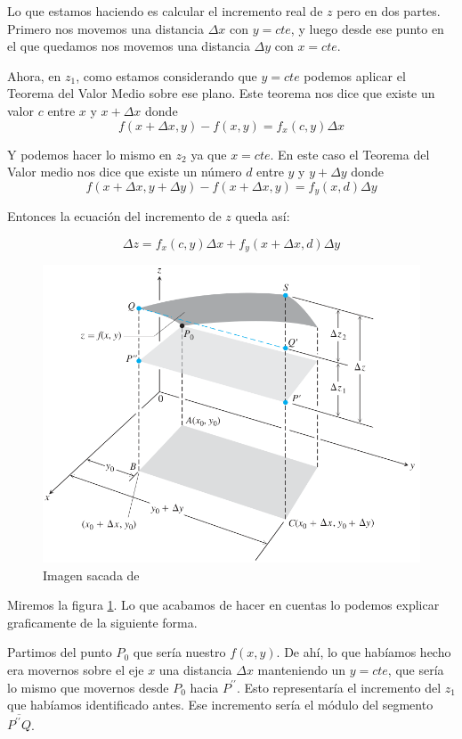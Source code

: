 \documentclass[12pt]{article}
\begin{document}
Lo que estamos haciendo es calcular el incremento real de $ z $ pero en dos partes. Primero nos movemos una distancia $ \Delta x $ con $ y = cte $, y luego desde ese punto en el que quedamos nos movemos una distancia $ \Delta y $ con $ x = cte $.

Ahora, en $ z_{1} $, como estamos considerando que $ y=cte $ podemos aplicar el Teorema del Valor Medio sobre ese plano. Este teorema nos dice que existe un valor $ c $ entre $ x $ y $ x + \Delta x $ donde
\[
	f(x + \Delta x, y) - f(x,y) = f_{x}(c,y)\Delta x
\]


Y podemos hacer lo mismo en $ z_{2} $ ya que $ x = cte $. En este caso el Teorema del Valor medio nos dice que existe un número $ d $ entre $ y $ y $ y + \Delta y $ donde
\[
	f(x + \Delta x, y + \Delta y) - f(x + \Delta x, y) = f_{y}(x,d)\Delta y
\]

Entonces la ecuación del incremento de $ z $ queda así: 

\[
	\Delta z = f_{x}(c, y)\Delta x + f_{y}(x + \Delta x, d)\Delta y
\]

\begin{figure}[H]
  \centering
  \includegraphics[width=0.7\linewidth]{imagenes/incremento_total.png}
  \caption{Imagen sacada de \parencite{thomas_calc_vv}}
  \label{fig:incremento_total}
\end{figure}

Miremos la figura \ref{fig:incremento_total}. Lo que acabamos de hacer en cuentas lo podemos explicar graficamente de la siguiente forma. 

Partimos del punto $ P_{0} $ que sería nuestro $ f(x,y) $. De ahí, lo que habíamos hecho era movernos sobre el eje $ x $ una distancia $ \Delta x $ manteniendo un $ y = cte $, que sería lo mismo que movernos desde $ P_{0} $ hacia $ P^{\prime\prime} $. Esto representaría el incremento del $ z_{1} $ que habíamos identificado antes. Ese incremento sería el módulo del segmento $ \overline{P^{\prime\prime}Q} $.
\end{document}
